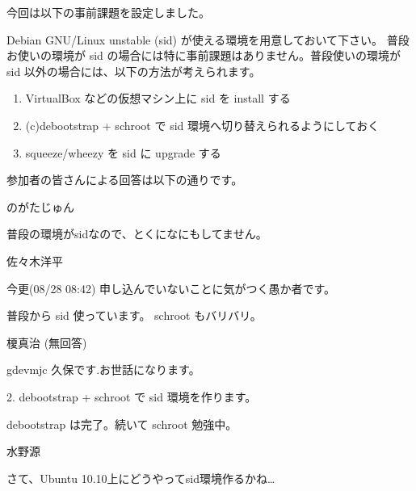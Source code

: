 \documentclass[mingoth,a4paper]{jsarticle}
\begin{document}
今回は以下の事前課題を設定しました。


Debian GNU/Linux unstable (sid) が使える環境を用意しておいて下さい。 普段お使いの環境が sid の場合には特に事前課題はありません。普段使いの環境が sid 以外の場合には、以下の方法が考えられます。

\begin{enumerate}

\item VirtualBox などの仮想マシン上に sid を install する
\item (c)debootstrap + schroot で sid 環境へ切り替えられるようにしておく
\item squeeze/wheezy を sid に upgrade する
\end{enumerate}

参加者の皆さんによる回答は以下の通りです。

\begin{prework}{ のがたじゅん }

普段の環境がsidなので、とくになにもしてません。
\end{prework}

\begin{prework}{ 佐々木洋平 }

今更(08/28 08:42) 申し込んでいないことに気がつく愚か者です。

普段から sid 使っています。 schroot もバリバリ。
\end{prework}

\begin{prework}{ 榎真治 }
(無回答)
\end{prework}

\begin{prework}{ gdevmjc }
久保です.お世話になります。

2. debootstrap + schroot で sid 環境を作ります。

debootstrap は完了。続いて schroot 勉強中。
\end{prework}

\begin{prework}{ 水野源 }

さて、Ubuntu 10.10上にどうやってsid環境作るかね…

\end{prework}
\end{document}
